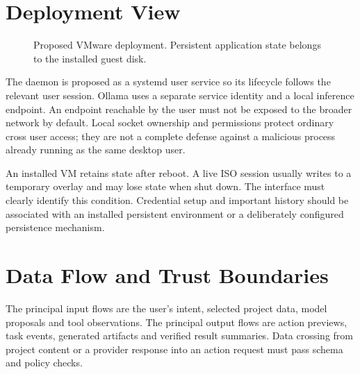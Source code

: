 \section{Deployment View}
\begin{figure}[htbp]\centering
{}
\caption{Proposed VMware deployment. Persistent application state belongs to the installed guest disk.}\label{fig:deployment}
\end{figure}

The daemon is proposed as a systemd user service so its lifecycle follows the relevant user session. Ollama uses a separate service identity and a local inference endpoint. An endpoint reachable by the user must not be exposed to the broader network by default. Local socket ownership and permissions protect ordinary cross user access; they are not a complete defense against a malicious process already running as the same desktop user.

An installed VM retains state after reboot. A live ISO session usually writes to a temporary overlay and may lose state when shut down. The interface must clearly identify this condition. Credential setup and important history should be associated with an installed persistent environment or a deliberately configured persistence mechanism.

\section{Data Flow and Trust Boundaries}
The principal input flows are the user's intent, selected project data, model proposals and tool observations. The principal output flows are action previews, task events, generated artifacts and verified result summaries. Data crossing from project content or a provider response into an action request must pass schema and policy checks.


